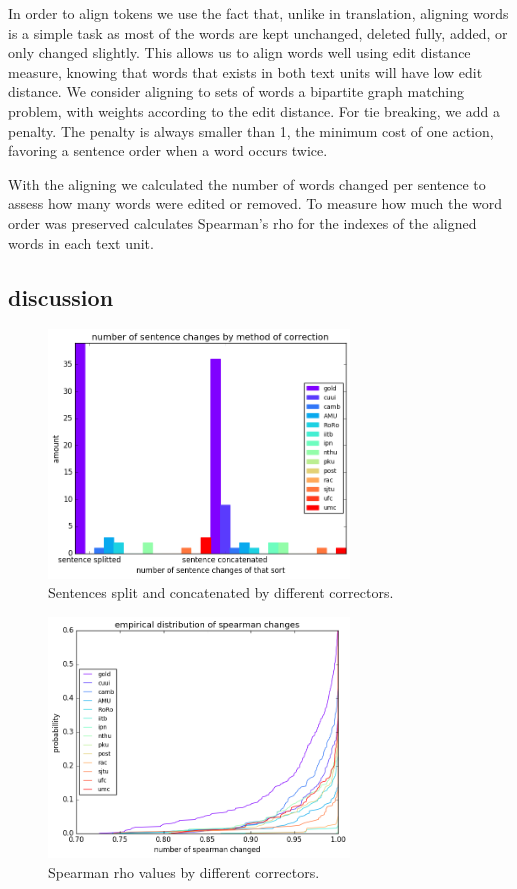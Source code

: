 \documentclass[english]{article}
\begin{document}
{In order to align tokens we use the fact that, unlike in translation,
aligning words is a simple task as most of the words are kept unchanged,
deleted fully, added, or only changed slightly. This allows us to
align words well using edit distance measure, knowing that words that
exists in both text units will have low edit distance. We consider
aligning to sets of words a bipartite graph matching problem, with
weights according to the edit distance. For tie breaking, we add a
penalty. The penalty is always smaller than 1, the minimum cost of
one action, favoring a sentence order when a word occurs twice.
 
With the aligning we calculated the number of words changed per sentence to assess how many words were edited or removed. 
To measure how much the word order was preserved
calculates Spearman's rho for the indexes of the aligned words in each text unit.

\subsection{discussion}
\begin{figure}
	\includegraphics[width = 8cm]{aligned}
	\caption{Sentences split and concatenated by different correctors.}
	\label{fig:split}
\end{figure}

\begin{figure}
	\includegraphics[width = 8cm]{spearman_ecdf}
	\caption{Spearman rho values by different correctors.}
	\label{fig:rho}
\end{figure}

}
\end{document}
